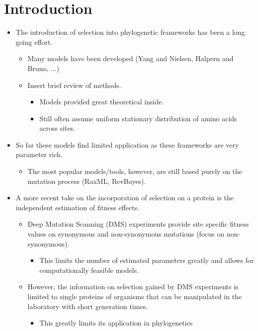 \documentclass[12pt]{article}
\begin{document}
\section*{Introduction}
\begin{itemize}
	\item The introduction of selection into phylogenetic frameworks has been a long going effort.
	\begin{itemize}
		\item Many models have been developed (Yang and Nielsen, Halpern and Bruno, ...)
		\item Insert brief review of methods.
		\begin{itemize}
			\item Models provided great theoretical inside.
			\item Still often assume uniform stationary distribution of amino acids across sites.
		\end{itemize}
	\end{itemize}
	\item So far these models find limited application as these frameworks are very parameter rich.
	\begin{itemize}
		\item The most popular models/tools, however, are still based purely on the mutation process (RaxML, RevBayes). 
	\end{itemize}
	\item A more recent take on the incorporation of selection on a protein is the independent estimation of fitness effects.
	\begin{itemize}
		\item Deep Mutation Scanning (DMS) experiments provide site specific fitness values on synonymous and non-synonymous mutations (focus on non-synonymous).
		\begin{itemize}
			\item This limits the number of estimated parameters greatly and allows for computationally feasible models.
		\end{itemize}
		\item However, the information on selection gained by DMS experiments is limited to single proteins of organisms that can be manipulated in the laboratory with short generation times.
		\begin{itemize}
			\item This greatly limits its application in phylogenetics
		\end{itemize}
	\end{itemize}

\end{itemize}
\end{document}
